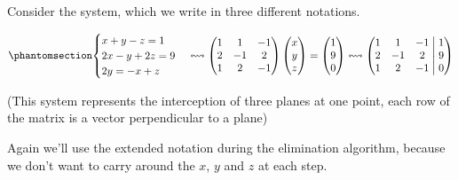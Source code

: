 \documentclass[
  letterpaper,
  DIV=11,
  numbers=noendperiod]{scrartcl}
\theoremstyle{definition}
\theoremstyle{remark}
\begin{document}
Consider the system, which we write in three different notations.

\begin{equation}\phantomsection\label{eq-possible_1}{
\begin{cases}
x+y-z=1\\
2x-y+2z = 9\\
2y=-x+z
\end{cases}
\leftrightsquigarrow
\begin{pmatrix}
1 & 1 & -1\\
2 & -1 & 2\\
1 & 2 &-1
\end{pmatrix}
\begin{pmatrix}
x\\
y\\
z
\end{pmatrix}
=
\begin{pmatrix}
1\\
9\\
0
\end{pmatrix}
\leftrightsquigarrow
\left(
\begin{matrix}
1 & 1 & -1\\
2 & -1 & 2\\
1 & 2 & -1
\end{matrix}
\;\middle|\;
\begin{matrix}
1\\
9\\
0
\end{matrix}
\right)
}\end{equation}

(This system represents the interception of three planes at one point,
each row of the matrix is a vector perpendicular to a plane)

Again we'll use the extended notation during the elimination algorithm,
because we don't want to carry around the \(x\), \(y\) and \(z\) at each
step.
\end{document}
